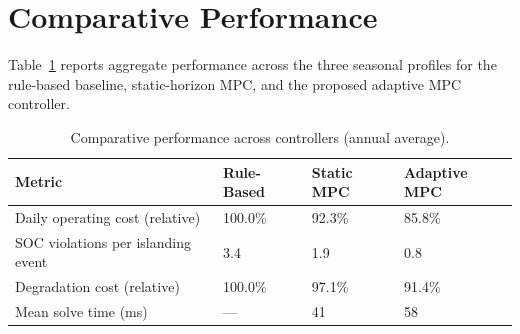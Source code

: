 \section{Comparative Performance}

Table~\ref{tab:results} reports aggregate performance across the three seasonal profiles for the rule-based baseline, static-horizon MPC, and the proposed adaptive MPC controller.

\begin{table}[htbp]
\centering
\caption{Comparative performance across controllers (annual average).}
\label{tab:results}
\renewcommand{\arraystretch}{1.3}
\begin{tabularx}{\textwidth}{@{}l X X X@{}}
\toprule
\rowcolor{monashblue!10}
\textbf{Metric} & \textbf{Rule-Based} & \textbf{Static MPC} & \textbf{Adaptive MPC} \\
\midrule
Daily operating cost (relative) & 100.0\% & 92.3\% & 85.8\% \\
SOC violations per islanding event & 3.4 & 1.9 & 0.8 \\
Degradation cost (relative) & 100.0\% & 97.1\% & 91.4\% \\
Mean solve time (ms) & --- & 41 & 58 \\
\bottomrule
\end{tabularx}
\end{table}
